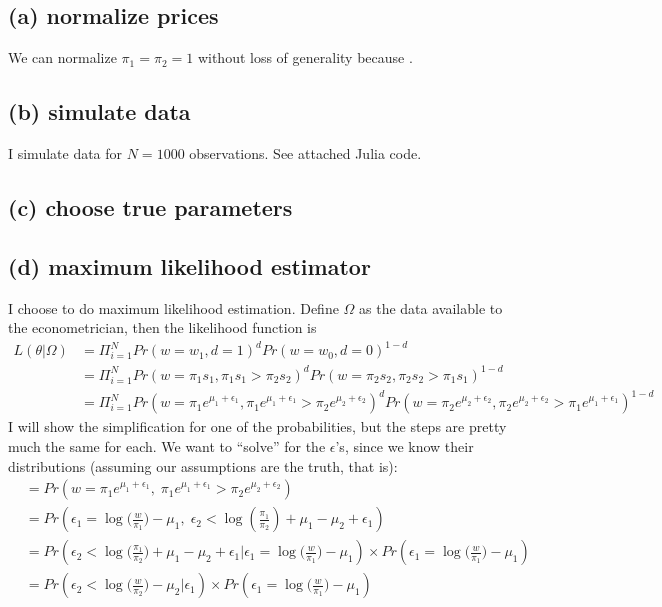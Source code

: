 \documentclass[12pt]{article}
\begin{document}
\subsection*{(a) normalize prices}
We can normalize $\pi_1 = \pi_2 = 1$ without loss of generality because . 

\subsection*{(b) simulate data}
I simulate data for $N=1000$ observations. See attached Julia code. 

\subsection*{(c) choose true parameters}


\subsection*{(d) maximum likelihood estimator}
I choose to do maximum likelihood estimation. Define $\Omega$ as the data available to the econometrician, then the likelihood function is 
\begin{align*}
    L(\theta | \Omega ) & = \Pi_{i = 1}^N Pr(w = w_1, d = 1)^d Pr(w = w_0, d = 0)^{1-d}
    \\
    & = \Pi_{i = 1}^N Pr(w = \pi_1 s_1, \pi_1 s_1 > \pi_2 s_2)^d 
                      Pr(w = \pi_2 s_2, \pi_2 s_2 > \pi_1 s_1)^{1-d}
    \\
    & = \Pi_{i = 1}^N Pr(w = \pi_1 e^{\mu_1 + \epsilon_1}, \pi_1 e^{\mu_1 + \epsilon_1} > \pi_2 e^{\mu_2 + \epsilon_2})^d 
                      Pr(w = \pi_2 e^{\mu_2 + \epsilon_2}, \pi_2 e^{\mu_2 + \epsilon_2} > \pi_1 e^{\mu_1 + \epsilon_1})^{1-d}
\end{align*}
I will show the simplification for one of the probabilities, but the steps are pretty much the same for each. We want to ``solve'' for the $\epsilon$'s, since we know their distributions (assuming our assumptions are the truth, that is):
\begin{align*}
    & = Pr(w = \pi_1 e^{\mu_1 + \epsilon_1},\; \pi_1 e^{\mu_1 + \epsilon_1} > \pi_2 e^{\mu_2 + \epsilon_2})
    \\
    & = Pr(\epsilon_1 = \log\big(\frac{w}{\pi_1}\big)-\mu_1,\; 
        \epsilon_2 < \log(\frac{\pi_1}{\pi_2}) +\mu_1 -\mu_2+\epsilon_1 )
    \\
    & = Pr(\epsilon_2 < \log\big(\frac{\pi_1}{\pi_2}\big) +\mu_1 -\mu_2+\epsilon_1 | \epsilon_1 = \log\big(\frac{w}{\pi_1}\big)-\mu_1) \times
        Pr(\epsilon_1 = \log\big(\frac{w}{\pi_1}\big)-\mu_1)
    \\
    & = Pr(\epsilon_2 < \log\big( \frac{w}{\pi_2} \big) - \mu_2 | \epsilon_1 ) 
        \times Pr(\epsilon_1 = \log\big(\frac{w}{\pi_1}\big)-\mu_1)
\end{align*}
\end{document}
